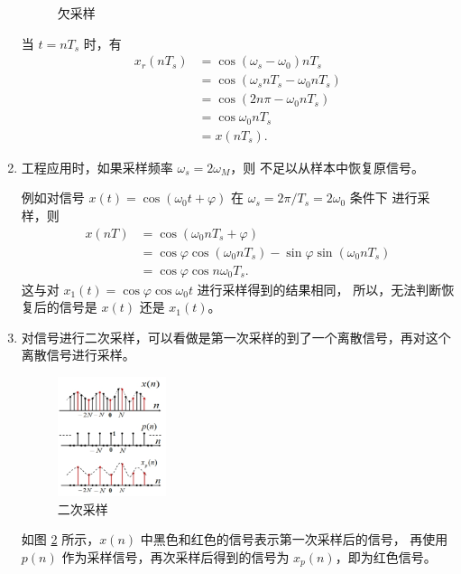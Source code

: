 \begin{definition}[欠采样]
\begin{enumerate}
\begin{figure}[H]
                \caption{欠采样}
                \label{fig:undersampling}
            \end{figure}
            当 $t = nT_s$ 时，有
            \begin{align*}
                x_r(nT_s) & = \cos(\omega_s - \omega_0) nT_s \\
                & = \cos(\omega_s n T_s - \omega_0nT_s) \\
                & = \cos(2n\pi - \omega_0 n T_s) \\
                & = \cos\omega_0 n T_s \\
                & = x(nT_s).
            \end{align*}
        \item 工程应用时，如果采样频率 $\omega_s = 2\omega_M$，则
            不足以从样本中恢复原信号。

            例如对信号 $x(t) = \cos(\omega_0 t + \varphi)$ 在 $\omega_s = 2\pi/T_s = 2\omega_0$ 条件下
            进行采样，则
            \begin{align*}
                x(nT) & = \cos(\omega_0 nT_s + \varphi) \\
                & = \cos\varphi\cos(\omega_0 nT_s) - \sin\varphi\sin(\omega_0 nT_s) \\
                & = \cos\varphi\cos n\omega_0 T_s.
            \end{align*}
            这与对 $x_1(t) = \cos\varphi\cos\omega_0 t$ 进行采样得到的结果相同，
            所以，无法判断恢复后的信号是 $x(t)$ 还是 $x_1(t)$。        
        \item 对信号进行二次采样，可以看做是第一次采样的到了一个离散信号，再对这个离散信号进行采样。
            \begin{figure}[H]
                \centering
                \includegraphics[width=0.3\textwidth]{chap2/img/resampling.png}
                \caption{二次采样}
                \label{fig:resampling.png}
            \end{figure}
            如图 \ref{fig:resampling.png} 所示，$x(n)$ 中黑色和红色的信号表示第一次采样后的信号，
            再使用 $p(n)$ 作为采样信号，再次采样后得到的信号为 $x_p(n)$，即为红色信号。
    \end{enumerate}
\end{definition}


